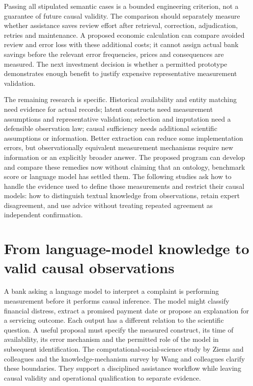 Passing all stipulated semantic cases is a bounded engineering criterion,
not a guarantee of future causal validity. The comparison should separately
measure whether assistance saves review effort after retrieval, correction,
adjudication, retries and maintenance. A proposed economic calculation can
compare avoided review and error loss with these additional costs; it cannot
assign actual bank savings before the relevant error frequencies, prices
and consequences are measured. The next investment decision is whether a
permitted prototype demonstrates enough benefit to justify expensive
representative measurement validation.

The remaining research is specific. Historical availability and entity
matching need evidence for actual records; latent constructs need measurement
assumptions and representative validation; selection and imputation need a
defensible observation law; causal sufficiency needs additional scientific
assumptions or information. Better extraction can reduce some implementation
errors, but observationally equivalent measurement mechanisms require new
information or an explicitly broader answer. The proposed program can develop
and compare these remedies now without claiming that an ontology, benchmark
score or language model has settled them. The following studies ask how to
handle the evidence used to define those measurements and restrict their
causal models: how to distinguish textual knowledge from observations, retain
expert disagreement, and use advice without treating repeated agreement as
independent confirmation.
\label{exec17:ontology-end}


\section{From language-model knowledge to valid causal observations}
\label{sec:exec24-css-knowledge}
A bank asking a language model to interpret a complaint is performing measurement before it performs causal inference. The model might classify financial distress, extract a promised payment date or propose an explanation for a servicing outcome. Each output has a different relation to the scientific question. A useful proposal must specify the measured construct, its time of availability, its error mechanism and the permitted role of the model in subsequent identification. The computational-social-science study by Ziems and colleagues and the knowledge-mechanism survey by Wang and colleagues clarify these boundaries. They support a disciplined assistance workflow while leaving causal validity and operational qualification to separate evidence.~\citep{exec24_css_original,exec24_knowledge_original,exec24_css_knowledge_reference}

